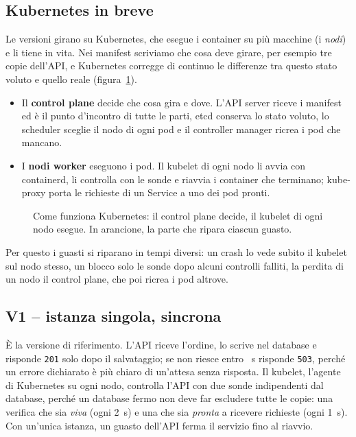 \subsection{Kubernetes in breve}
\label{s:kubernetes}

Le versioni girano su Kubernetes, che esegue i container su più macchine (i \emph{nodi}) e li tiene in vita. Nei manifest scriviamo che cosa deve girare, per esempio tre copie dell'API, e Kubernetes corregge di continuo le differenze tra questo stato voluto e quello reale (figura~\ref{fig:kubernetes}).
\begin{itemize}
  \item Il \textbf{control plane} decide che cosa gira e dove. L'API server riceve i manifest ed è il punto d'incontro di tutte le parti, etcd conserva lo stato voluto, lo scheduler sceglie il nodo di ogni pod e il controller manager ricrea i pod che mancano.
  \item I \textbf{nodi worker} eseguono i pod. Il kubelet di ogni nodo li avvia con containerd, li controlla con le sonde e riavvia i container che terminano; kube-proxy porta le richieste di un Service a uno dei pod pronti.
\end{itemize}

\begin{figure}[H]
\centering
\resizebox{\linewidth}{!}{}
\caption{Come funziona Kubernetes: il control plane decide, il kubelet di ogni nodo esegue. In arancione, la parte che ripara ciascun guasto.}
\label{fig:kubernetes}
\end{figure}

Per questo i guasti si riparano in tempi diversi: un crash lo vede subito il kubelet sul nodo stesso, un blocco solo le sonde dopo alcuni controlli falliti, la perdita di un nodo il control plane, che poi ricrea i pod altrove.

\subsection{V1 -- istanza singola, sincrona}
\label{s:v1}

È la versione di riferimento. L'API riceve l'ordine, lo scrive nel database e risponde \texttt{201} solo dopo il salvataggio; se non riesce entro ~s risponde \texttt{503}, perché un errore dichiarato è più chiaro di un'attesa senza risposta. Il kubelet, l'agente di Kubernetes su ogni nodo, controlla l'API con due sonde indipendenti dal database, perché un database fermo non deve far escludere tutte le copie: una verifica che sia \emph{viva} (ogni 2~s) e una che sia \emph{pronta} a ricevere richieste (ogni 1~s). Con un'unica istanza, un guasto dell'API ferma il servizio fino al riavvio.


